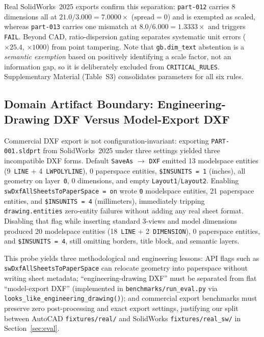 \documentclass[nocopyright,nolists,upint,varvw,hyphenate]{asmejour}
\begin{document}
Real SolidWorks~2025 exports confirm this separation: \texttt{part-012} carries 8 dimensions all at $21.0/3.000 = 7.0000\times$ ($\text{spread}=0$) and is exempted as scaled, whereas \texttt{part-013} carries one mismatch at $8.0/6.000 = 1.3333\times$ and triggers \texttt{FAIL}. Beyond CAD, ratio-dispersion gating separates systematic unit errors ($\times 25.4$, $\times 1000$) from point tampering. Note that \texttt{gb.dim\_text} abstention is a \emph{semantic exemption} based on positively identifying a scale factor, not an information gap, so it is deliberately excluded from \texttt{CRITICAL\_RULES}. Supplementary Material (Table~S3) consolidates parameters for all six rules.

\subsection{Domain Artifact Boundary: Engineering-Drawing DXF Versus Model-Export DXF}\label{sec:dxf_modes}

Commercial DXF export is not configuration-invariant: exporting \texttt{PART-001.sldprt} from SolidWorks~2025 under three settings yielded three incompatible DXF forms. Default \texttt{SaveAs} $\to$ \texttt{DXF} emitted 13 modelspace entities (9~\texttt{LINE} + 4~\texttt{LWPOLYLINE}), 0 paperspace entities, \texttt{\$INSUNITS = 1} (inches), all geometry on layer~\texttt{0}, 0 dimensions, and empty \texttt{Layout1}/\texttt{Layout2}. Enabling \texttt{swDxfAllSheetsToPaperSpace = on} wrote \texttt{0} modelspace entities, 21 paperspace entities, and \texttt{\$INSUNITS = 4} (millimeters), immediately tripping \texttt{drawing.entities} zero-entity failures without adding any real sheet format. Disabling that flag while inserting standard 3-views and model dimensions produced 20 modelspace entities (18~\texttt{LINE} + 2~\texttt{DIMENSION}), 0 paperspace entities, and \texttt{\$INSUNITS = 4}, still omitting borders, title block, and semantic layers.

This probe yields three methodological and engineering lessons: API flags such as \texttt{swDxfAllSheetsToPaperSpace} can relocate geometry into paperspace without writing sheet metadata; ``engineering-drawing DXF'' must be separated from flat ``model-export DXF'' (implemented in \texttt{benchmarks/run\_eval.py} via \texttt{looks\_like\_engineering\_drawing()}); and commercial export benchmarks must preserve zero post-processing and exact export settings, justifying our split between AutoCAD \texttt{fixtures/real/} and SolidWorks \texttt{fixtures/real\_sw/} in Section~\ref{sec:eval}.
\end{document}
